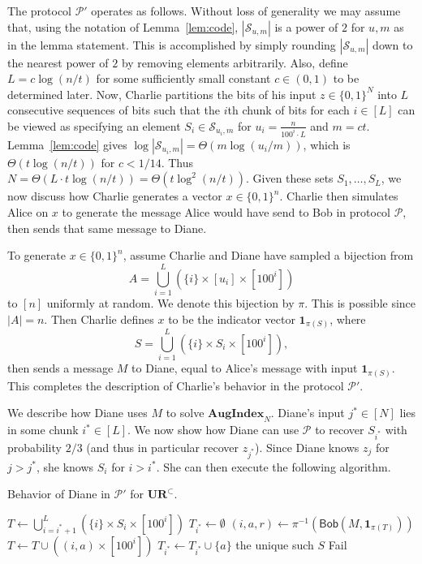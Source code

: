\documentclass[11pt]{article}
\newcommand{\diane}{\mathsf{Diane}}
\newcommand{\aug}{\mathbf{AugIndex}\xspace}
\newcommand{\query}{\mathsf{Bob}}
\newcommand{\ur}{\mathbf{UR}\xspace}
\begin{document}
The protocol $\mathcal P'$ operates as follows. Without loss of generality we may assume that, using the notation of Lemma~\ref{lem:code}, $|\mathcal S_{u,m}|$ is a power of $2$ for $u, m$ as in the lemma statement. This is accomplished by simply rounding $|\mathcal S_{u,m}|$ down to the nearest power of $2$ by removing elements arbitrarily. Also, define $L = c\log(n/t)$ for some sufficiently small constant $c\in(0,1)$ to be determined later. Now, Charlie partitions the bits of his input $z\in\{0,1\}^N$ into $L$ consecutive sequences of bits such that the $i$th chunk of bits for each $i\in[L]$ can be viewed as specifying an element $S_i\in \mathcal S_{u_i,m}$ for $u_i = \frac n{100^i\cdot L}$ and $m = ct$. Lemma~\ref{lem:code} gives $\log|\mathcal S_{u_i,m}| = \Theta(m\log(u_i/m))$, which is $\Theta(t\log(n/t))$ for $c < 1/14$. Thus $N = \Theta(L\cdot t\log(n/t)) = \Theta(t\log^2(n/t))$. Given these sets $S_1,\ldots,S_L$, we now discuss how Charlie generates a vector $x\in\{0,1\}^n$. Charlie then simulates Alice on $x$ to generate the message Alice would have send to Bob in protocol $\mathcal P$, then sends that same message to Diane.

To generate $x\in\{0,1\}^n$, assume Charlie and Diane have sampled a bijection from 
\begin{equation}\label{eq:pi-origin}
A = \bigcup_{i=1}^L (\{i\} \times [u_i]\times [100^i])
\end{equation}
to $[n]$ uniformly at random. We denote this bijection by $\pi$. This is possible since $|A| = n$. Then Charlie defines $x$ to be the indicator vector $\mathbf{1}_{\pi(S)}$, where
$$
S = \bigcup_{i=1}^L (\{i\} \times S_i \times [100^i]),
$$
then sends a message $M$ to Diane, equal to Alice's message with input $\mathbf{1}_{\pi(S)}$. This completes the description of Charlie's behavior in the protocol $\mathcal P'$.

We describe how Diane uses $M$ to solve $\aug_N$. Diane's input $j^*\in[N]$ lies in some chunk $i^*\in[L]$. We now show how Diane can use $\mathcal P$ to recover $S_{i^*}$ with probability $2/3$ (and thus in particular recover $z_{j^*}$). Since Diane knows $z_j$ for $j>j^*$, she knows $S_i$ for $i>i^*$. She can then execute the following algorithm.


\begin{algorithm}[H] 
  \caption{Behavior of Diane in $\mathcal P'$ for $\ur^\subset$.} \label{algo:diane1}
  \begin{algorithmic}[1]
    \Procedure{$\diane$}{$M$}
    \State $T \leftarrow \bigcup_{i=i^*+1}^L (\{i\} \times S_i \times [100^i])$
    \State $T_{i^*}\leftarrow \emptyset$
      \State $(i,a,r)\leftarrow \pi^{-1}(\query(M, \mathbf{1}_{\pi(T)}))$
      \State $T\leftarrow T \cup ((i,a) \times [100^i])$
        \State $T_{i^*} \leftarrow T_{i^*}\cup \{a\}$
      \EndIf
    \EndWhile
      \State \Return the unique such $S$
    \Else
      \State \Return \textsf{Fail}
    \EndIf
    \EndProcedure
  \end{algorithmic}
\end{algorithm}
\end{document}
